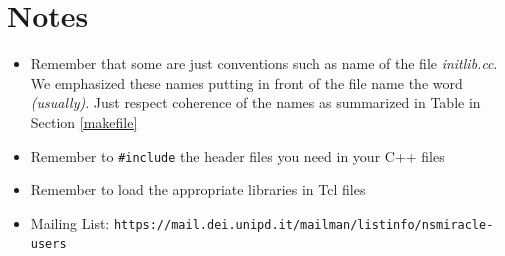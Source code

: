 \documentclass[a4paper,10pt]{article}
\begin{document}
\section{Notes}
\begin{itemize}

\item Remember that some are just conventions such as name of the file \emph{initlib.cc}. We emphasized these names putting in front of the file name the word \emph{(usually)}. Just respect coherence of the names as summarized in Table in Section \ref{makefile}

\item Remember to \verb=#include= the header files you need in your C++ files

\item Remember to load the appropriate libraries in Tcl files

\item Mailing List: \texttt{https://mail.dei.unipd.it/mailman/listinfo/nsmiracle-users}
\end{itemize}
\end{document}
